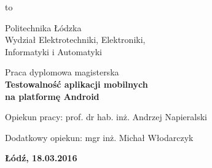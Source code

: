 \begin{titlepage}
    \vbox to \textheight
    {
        \begin{center}
            \begin{center}
                \LARGE
                Politechnika Łódzka \\
                Wydział Elektrotechniki, Elektroniki, \\
				Informatyki i Automatyki

            \end{center}

        \vspace*{3.75\baselineskip}
        \par\vspace{\smallskipamount}

        \vspace*{2\baselineskip}
        {\large
        Praca dyplomowa magisterska\\
        \huge\bfseries 
        Testowalność aplikacji mobilnych\\ na platformę Android\par}

        \vspace{2\baselineskip}{Rafał Sowiak\\Nr albumu: 199564\par}

        \vspace*{7\baselineskip}
        {Opiekun pracy: prof. dr hab. inż. Andrzej Napieralski\par}
        {Dodatkowy opiekun: mgr inż. Michał Włodarczyk\par}

        \vspace*{2\baselineskip}

        \begin{center}
            \textbf{Łódź, 18.03.2016}
        \end{center}

        \end{center}
    }
\end{titlepage}
